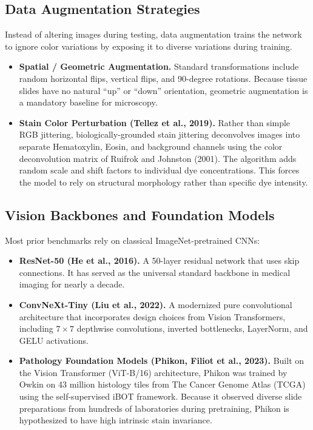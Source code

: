 \documentclass[11pt,a4paper]{article}
\begin{document}
\subsection{Data Augmentation Strategies}
Instead of altering images during testing, data augmentation trains the network to
ignore color variations by exposing it to diverse variations during training.
\begin{itemize}
  \item \textbf{Spatial / Geometric Augmentation.} Standard transformations include
        random horizontal flips, vertical flips, and 90-degree rotations. Because
        tissue slides have no natural ``up'' or ``down'' orientation, geometric
        augmentation is a mandatory baseline for microscopy.
  \item \textbf{Stain Color Perturbation (Tellez et al., 2019).} Rather than simple
        RGB jittering, biologically-grounded stain jittering deconvolves images into
        separate Hematoxylin, Eosin, and background channels using the color
        deconvolution matrix of Ruifrok and Johnston (2001). The algorithm adds random
        scale and shift factors to individual dye concentrations. This forces the
        model to rely on structural morphology rather than specific dye intensity.
\end{itemize}

\subsection{Vision Backbones and Foundation Models}
Most prior benchmarks rely on classical ImageNet-pretrained CNNs:
\begin{itemize}
  \item \textbf{ResNet-50 (He et al., 2016).} A 50-layer residual network that uses
        skip connections. It has served as the universal standard backbone in medical
        imaging for nearly a decade.
  \item \textbf{ConvNeXt-Tiny (Liu et al., 2022).} A modernized pure convolutional
        architecture that incorporates design choices from Vision Transformers,
        including $7\times7$ depthwise convolutions, inverted bottlenecks, LayerNorm,
        and GELU activations.
  \item \textbf{Pathology Foundation Models (Phikon, Filiot et al., 2023).} Built on
        the Vision Transformer (ViT-B/16) architecture, Phikon was trained by Owkin on
        43 million histology tiles from The Cancer Genome Atlas (TCGA) using the
        self-supervised iBOT framework. Because it observed diverse slide preparations
        from hundreds of laboratories during pretraining, Phikon is hypothesized to
        have high intrinsic stain invariance.
\end{itemize}
\end{document}
